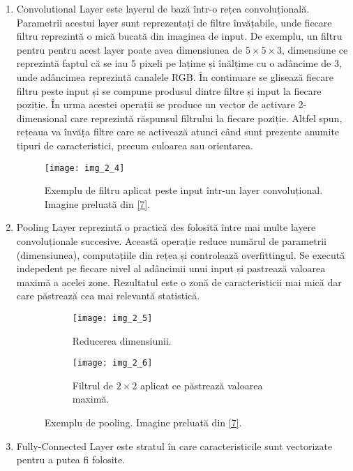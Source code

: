 \begin{enumerate}
  \item Convolutional Layer este layerul de bază într-o rețea convoluțională. Parametrii acestui layer sunt reprezentați de filtre învățabile, unde fiecare filtru reprezintă o mică bucată din imaginea de input. De exemplu, un filtru pentru pentru acest layer poate avea dimensiunea de $5\times5\times3$, dimensiune ce reprezintă faptul că se iau 5 pixeli pe lațime și înălțime cu o adâncime de 3, unde adâncimea reprezintă canalele RGB. În continuare se glisează fiecare filtru peste input și se compune produsul dintre filtre și input la fiecare poziție. În urma acestei operații se produce un vector de activare 2-dimensional care reprezintă răspunsul filtrului la fiecare poziție. Altfel spun, rețeaua va învăța filtre care se activează atunci când sunt prezente anumite tipuri de caracteristici, precum culoarea sau orientarea.

\begin{figure}[!h]
	\centering
	\texttt{[image: img\_2\_4]}
	\caption[Exemplu de filtru aplicat peste input]{Exemplu de filtru aplicat peste input într-un layer convoluțional. Imagine preluată din \hyperlink{datameetsmedia}{[7]}.}
\end{figure}   
  
  \item Pooling Layer reprezintă o practică des folosită între mai multe layere convoluționale succesive. Această operație reduce numărul de parametrii (dimensiunea), computațiile din rețea și controlează overfittingul. Se execută indepedent pe fiecare nivel al adâncimii unui input și pastrează valoarea maximă a acelei zone. Rezultatul este o zonă de caracteristicii mai mică dar care păstrează cea mai relevantă statistică.

\begin{figure}[!tbp]
  \begin{subfigure}[b]{0.4\textwidth}
    \texttt{[image: img\_2\_5]}
    \caption{Reducerea dimensiunii.}
    \label{fig:f1}
  \end{subfigure}
  \hfill
  \begin{subfigure}[b]{0.4\textwidth}
    \texttt{[image: img\_2\_6]}
    \caption{Filtrul de $2\times2$ aplicat ce păstrează valoarea maximă.}
    \label{fig:f2}
  \end{subfigure}
  \caption[Exemplu de pooling]{Exemplu de pooling. Imagine preluată din \hyperlink{datameetsmedia}{[7]}.}
\end{figure}
  
  \item Fully-Connected Layer este stratul în care caracteristicile sunt vectorizate pentru a putea fi folosite.
\end{enumerate}

